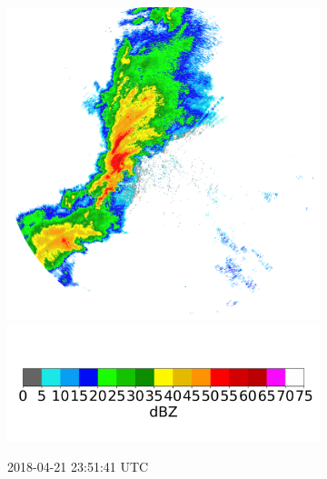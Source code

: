 \begin{figure}[ht]
\begin{subfigure}[b]{0.3\textwidth}
		\includegraphics[width=\textwidth]{./thesis_code/plots/midlothian.tx-20180421-235141-ref.png}
		\includegraphics[width=\textwidth]{./thesis_code/plots/dfw_colormap.png}
		\caption{2018-04-21 23:51:41 UTC}
		\label{fig:bestmodel_translation2}
	\end{subfigure}
	\begin{subfigure}[b]{0.3\textwidth}

\end{subfigure}
\end{figure}
